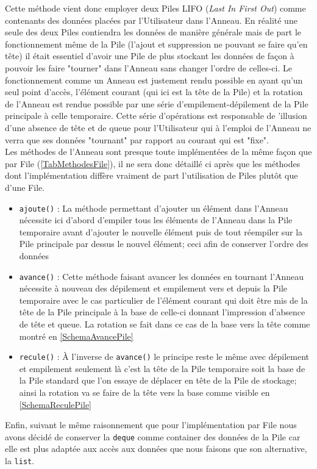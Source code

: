 \documentclass{article}
\newcommand{\info}{\texttt}
\begin{document}
        Cette méthode vient donc employer deux Piles LIFO (\emph{Last In First Out}) comme contenants des données placées par l'Utilisateur dans l'Anneau. En réalité une seule des deux Piles contiendra les données de manière générale mais de part le fonctionnement même de la Pile (l'ajout et suppression ne pouvant se faire qu'en tête) il était essentiel d'avoir une Pile de plus stockant les données de façon à pouvoir les faire "tourner" dans l'Anneau sans changer l'ordre de celles-ci. Le fonctionnement comme un Anneau est justement rendu possible en ayant qu'un seul point d'accès, l'élément courant (qui ici est la tête de la Pile) et la rotation de l'Anneau est rendue possible par une série d'empilement-dépilement de la Pile principale à celle temporaire. Cette série d'opérations est responsable de 'illusion d'une absence de tête et de queue pour l'Utilisateur qui à l'emploi de l'Anneau ne verra que ses données "tournant" par rapport au courant qui est "fixe".\\
        Les méthodes de l'Anneau sont presque toute implémentées de la même façon que par File (\ref{TabMethodesFile}), il ne sera donc détaillé ci après que les méthodes dont l'implémentation diffère vraiment de part l'utilisation de Piles plutôt que d'une File.
        \begin{itemize}
            \item \info{ajoute()} : La méthode permettant d'ajouter un élément dans l'Anneau nécessite ici d'abord d'empiler tous les éléments de l'Anneau dans la Pile temporaire avant d'ajouter le nouvelle élément puis de tout réempiler sur la Pile principale par dessus le nouvel élément; ceci afin de conserver l'ordre des données
            \item \info{avance()} : Cette méthode faisant avancer les données en tournant l'Anneau nécessite à nouveau des dépilement et empilement vers et depuis la Pile temporaire avec le cas particulier de l'élément courant qui doit être mis de la tête de la Pile principale à la base de celle-ci donnant l'impression d'absence de tête et queue. La rotation se fait dans ce cas de la base vers la tête comme montré en \ref{SchemaAvancePile}
            \item \info{recule()} : \`A l'inverse de \info{avance()} le principe reste le même avec dépilement et empilement seulement là c'est la tête de la Pile temporaire soit la base de la Pile standard que l'on essaye de déplacer en tête de la Pile de stockage; ainsi la rotation va se faire de la tête vers la base comme visible en \ref{SchemaReculePile}
        \end{itemize}
        Enfin, suivant le même raisonnement que pour l'implémentation par File nous avons décidé de conserver la \info{deque} comme container des données de la Pile car elle est plus adaptée aux accès aux données que nous faisons que son alternative, la \info{list}.
        
\end{document}

